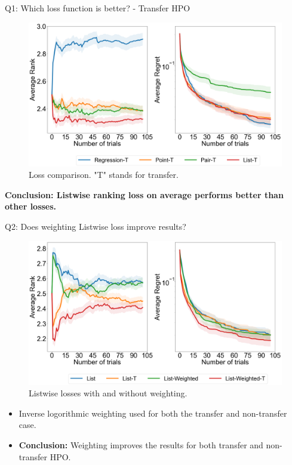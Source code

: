 \documentclass{beamer}
\begin{document}
\begin{frame}[t]{Q1: Which loss function is better? - Transfer HPO}

\begin{figure}[h]
  \centering
    \includegraphics[scale=0.12]{images/Q1AblationTransfer} 
     \caption{Loss comparison. "T" stands for transfer.}
    \label{fig:Q1AblationTransfer}
\end{figure}

\textbf{Conclusion:  Listwise ranking loss on average performs better than other losses.}

\end{frame}

\begin{frame}[t]{Q2: Does weighting Listwise loss improve results?}
\begin{figure}[h]
  \centering
    \includegraphics[scale=0.12]{images/Q2Ablation}
    \caption{Listwise losses with and without weighting.}
    \label{fig:Q2Ablation}
\end{figure}

\begin{itemize}
\item Inverse logorithmic weighting used for both the transfer and non-transfer case.
\item \textbf{Conclusion:} Weighting improves the results for both transfer and non-transfer HPO.
\end{itemize}

\end{frame}
\end{document}
